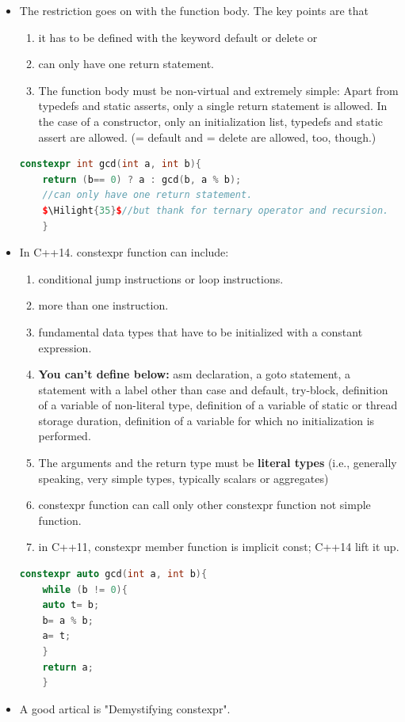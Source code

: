 \documentclass[a4paper,11pt,twoside]{book}
\newcommand{\Hilight}[1]{\makebox[0pt][l]{\color{yellow}\rule[-3pt]{#1em}{11pt}}}
\newcommand{\Hilight}[1]{}
\begin{document}
\begin{itemize}
	
	\item The restriction goes on with the function body. The key points are that
	\begin{enumerate}
		\item it has to be defined with the keyword default or delete or
		\item can only have one return statement.
		
		\item The function body must be non-virtual and extremely simple: Apart from typedefs and static asserts, only a single return statement is allowed. In the case of a constructor, only an initialization list, typedefs and static assert are allowed. (= default and = delete are allowed, too, though.)
		
	\end{enumerate}
	\begin{lstlisting}[frame=single, language=c++]
	constexpr int gcd(int a, int b){
	return (b== 0) ? a : gcd(b, a % b);
	//can only have one return statement.
	$\Hilight{35}$//but thank for ternary operator and recursion.
	}
	\end{lstlisting}
	
	\item In C++14. constexpr function can include: 
	\begin{enumerate}
		\item conditional jump instructions or loop instructions.
		\item more than one instruction.
		\item fundamental data types that have to be initialized with a constant expression.
		\item \textbf{You can't define below:} asm declaration, a goto statement, a statement with a label other than case and default, try-block, definition of a variable of non-literal type, definition of a variable of static or thread storage duration, definition of a variable for which no initialization is performed.
		
		\item The arguments and the return type must be \textbf{literal types} (i.e., generally speaking, very simple types, typically scalars or aggregates)
		
		\item constexpr function can call only other constexpr function not simple function.
		
		\item in C++11, constexpr member function is implicit const; C++14 lift it up.
	\end{enumerate}
	\begin{lstlisting}[frame=single, language=c++]
	constexpr auto gcd(int a, int b){
	while (b != 0){
	auto t= b;
	b= a % b;
	a= t;
	}
	return a;
	}
	\end{lstlisting}
	
	\item A good artical is "Demystifying constexpr". 
	
\end{itemize}
\end{document}
